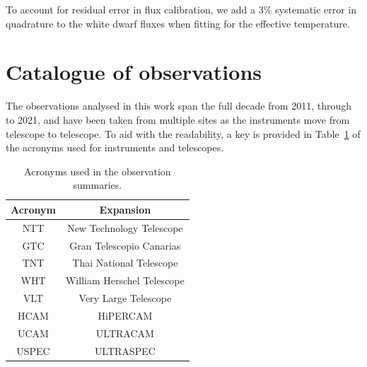 To account for residual error in flux calibration, we add a 3\% systematic error in quadrature to the white dwarf fluxes when fitting for the effective temperature.


\section{Catalogue of observations}

The observations analysed in this work span the full decade from 2011, through to 2021, and have been taken from multiple sites as the instruments move from telescope to telescope. To aid with the readability, a key is provided in Table~\ref{tab:observation acronyms} of the acronyms used for instruments and telescopes. 



\begin{table}
    \centering
    \begin{tabular}{c|c}
        Acronym & Expansion \\
        \hline
        NTT & New Technology Telescope \\
        GTC & Gran Telescopio Canarias \\
        TNT & Thai National Telescope \\
        WHT & William Herschel Telescope \\
        VLT & Very Large Telescope \\ 
        HCAM & HiPERCAM \\
        UCAM & ULTRACAM \\
        USPEC & ULTRASPEC \\
    \end{tabular}
    \caption{Acronyms used in the observation summaries.}
    \label{tab:observation acronyms}
\end{table}
